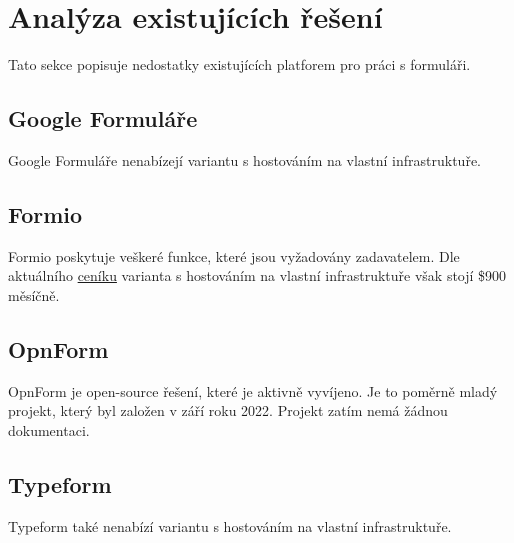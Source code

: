 \chapter{Analýza existujících řešení}\label{ch:analyza-existujicich-reseni-pro-praci-s-formulari}

Tato sekce popisuje nedostatky existujících platforem pro práci s formuláři.

\section*{Google Formuláře}\label{sec:google-formulare}

Google Formuláře nenabízejí variantu s hostováním na vlastní infrastruktuře.

\section*{Formio}\label{sec:formio}

Formio poskytuje veškeré funkce, které jsou vyžadovány zadavatelem.
Dle aktuálního \href{https://form.io/pricing}{ceníku} varianta s hostováním na vlastní infrastruktuře však stojí \$900 měsíčně.

\section*{OpnForm}\label{sec:opnform}

OpnForm je open-source řešení, které je aktivně vyvíjeno.
Je to poměrně mladý projekt, který byl založen v září roku 2022.
Projekt zatím nemá žádnou dokumentaci.

\section*{Typeform}\label{sec:typeform}

Typeform také nenabízí variantu s hostováním na vlastní infrastruktuře.


